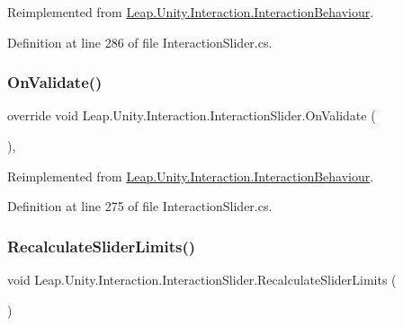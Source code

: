 Reimplemented from \mbox{\hyperlink{class_leap_1_1_unity_1_1_interaction_1_1_interaction_behaviour_af4b5101862906b5d2c7da28136778a8f}{Leap.\+Unity.\+Interaction.\+Interaction\+Behaviour}}.



Definition at line 286 of file Interaction\+Slider.\+cs.

\mbox{\label{class_leap_1_1_unity_1_1_interaction_1_1_interaction_slider_a6e91615fa8a4ab9ea1d211b3dcaa0e2b}} 
\subsubsection{\texorpdfstring{OnValidate()}{OnValidate()}}
{\footnotesize\ttfamily override void Leap.\+Unity.\+Interaction.\+Interaction\+Slider.\+On\+Validate (\begin{DoxyParamCaption}{ }\end{DoxyParamCaption})\hspace{0.3cm}{\ttfamily [protected]}, {\ttfamily [virtual]}}



Reimplemented from \mbox{\hyperlink{class_leap_1_1_unity_1_1_interaction_1_1_interaction_behaviour_a1a7a6e32f61fa0819c7d35107f3c7fd4}{Leap.\+Unity.\+Interaction.\+Interaction\+Behaviour}}.



Definition at line 275 of file Interaction\+Slider.\+cs.

\mbox{\label{class_leap_1_1_unity_1_1_interaction_1_1_interaction_slider_af984b10c1e7d956a61505d1294ab28e4}} 
\subsubsection{\texorpdfstring{RecalculateSliderLimits()}{RecalculateSliderLimits()}}
{\footnotesize\ttfamily void Leap.\+Unity.\+Interaction.\+Interaction\+Slider.\+Recalculate\+Slider\+Limits (\begin{DoxyParamCaption}{ }\end{DoxyParamCaption})}



